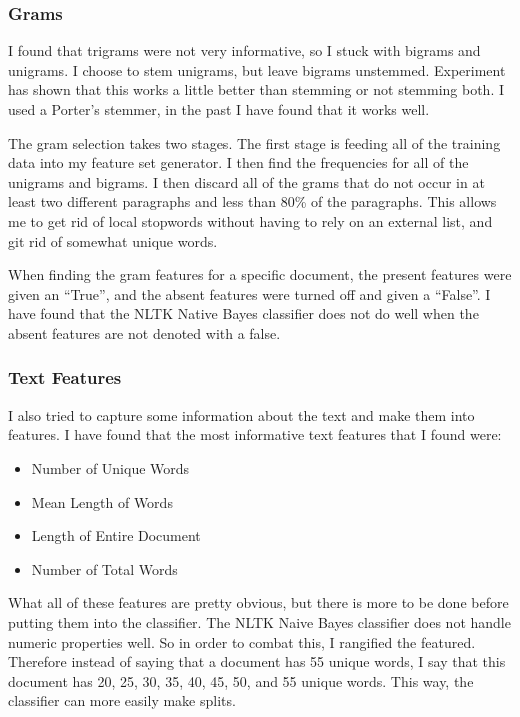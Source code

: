 \documentclass[]{IEEEtran}
\begin{document}
\subsubsection{Grams}
I found that trigrams were not very informative, so I stuck with bigrams and unigrams.
I choose to stem unigrams, but leave bigrams unstemmed. Experiment has shown that this works a little better than
stemming or not stemming both. I used a Porter's stemmer, in the past I have found that it works well.

The gram selection takes two stages. The first stage is feeding all of the training data into my feature set generator.
I then find the frequencies for all of the unigrams and bigrams. I then discard all of the grams that do not occur in
at least two different paragraphs and less than 80\% of the paragraphs. This allows me to get rid of local stopwords
without having to rely on an external list, and git rid of somewhat unique words.

When finding the gram features for a specific document, the present features were given an ``True'', and the absent
features were turned off and given a ``False''. I have found that the NLTK Native Bayes classifier does not do
well when the absent features are not denoted with a false.

\subsubsection{Text Features}
I also tried to capture some information about the text and make them into features.
I have found that the most informative text features that I found were:

\begin{itemize}
   \item Number of Unique Words
   \item Mean Length of Words
   \item Length of Entire Document
   \item Number of Total Words
\end{itemize}

What all of these features are pretty obvious, but there is more to be done before putting them into the classifier.
The NLTK Naive Bayes classifier does not handle numeric properties well. So in order to combat this, I rangified the
featured. Therefore instead of saying that a document has 55 unique words, I say that this document has
20, 25, 30, 35, 40, 45, 50, and 55 unique words. This way, the classifier can more easily make splits.
\end{document}
